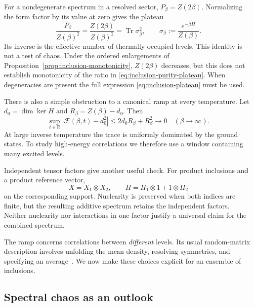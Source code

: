 \documentclass[a4paper,11pt]{article}
\theoremstyle{definition}
\begin{document}
For a nondegenerate spectrum in a resolved sector, $P_\beta=Z(2\beta)$. Normalizing the form factor by its value at zero gives the plateau
\begin{equation}
 \frac{P_\beta}{Z(\beta)^2}
   =\frac{Z(2\beta)}{Z(\beta)^2}
   =\operatorname{Tr}\sigma_\beta^2,
 \qquad
 \sigma_\beta:=\frac{e^{-\beta H}}{Z(\beta)}.
 \label{eq:inclusion-purity-plateau}
\end{equation}
Its inverse is the effective number of thermally occupied levels. This identity is not a test of chaos. Under the ordered enlargements of Proposition~\ref{prop:inclusion-monotonicity}, $Z(2\beta)$ decreases, but this does not establish monotonicity of the ratio in \eqref{eq:inclusion-purity-plateau}. When degeneracies are present the full expression \eqref{eq:inclusion-plateau} must be used.

There is also a simple obstruction to a canonical ramp at every temperature. Let $d_0=\dim\ker H$ and $R_\beta=Z(\beta)-d_0$. Then
\begin{equation}
 \sup_{t\in\mathbb R}|\mathcal F(\beta,t)-d_0^2|
   \le 2d_0R_\beta+R_\beta^2
   \longrightarrow0\quad(\beta\to\infty).
 \label{eq:inclusion-vacuum-bound}
\end{equation}
At large inverse temperature the trace is uniformly dominated by the ground states. To study high-energy correlations we therefore use a window containing many excited levels.

Independent tensor factors give another useful check. For product inclusions and a product reference vector,
\begin{equation}
 X=X_1\otimes X_2,
 \qquad H=H_1\otimes1+1\otimes H_2
 \label{eq:inclusion-tensor-product}
\end{equation}
on the corresponding support. Nuclearity is preserved when both indices are finite, but the resulting additive spectrum retains the independent factors. Neither nuclearity nor interactions in one factor justify a universal claim for the combined spectrum.

The ramp concerns correlations between \emph{different} levels. Its usual random-matrix description involves unfolding the mean density, resolving symmetries, and specifying an average~\cite{Cotler2017,CipolloniErdosSchroder2023}. We now make these choices explicit for an ensemble of inclusions.

\subsection{Spectral chaos as an outlook}\label{subsec:qft-spectral-outlook}
\end{document}
